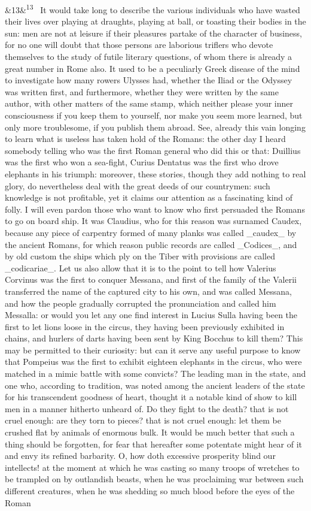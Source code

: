 \documentclass[12pt]{article}
\newcommand{\para}[1][]{\par\noindent\ifx&#1&\else\textsuperscript{\footnotesize #1}~\fi}
\begin{document}
\para[13] It would take long to describe the various individuals who have wasted their lives over playing at draughts, playing at ball, or toasting their bodies in the sun: men are not at leisure if their pleasures partake of the character of business, for no one will doubt that those persons are laborious triflers who devote themselves to the study of futile literary questions, of whom there is already a great number in Rome also. It used to be a peculiarly Greek disease of the mind to investigate how many rowers Ulysses had, whether the Iliad or the Odyssey was written first, and furthermore, whether they were written by the same author, with other matters of the same stamp, which neither please your inner consciousness if you keep them to yourself, nor make you seem more learned, but only more troublesome, if you publish them abroad. See, already this vain longing to learn what is useless has taken hold of the Romans: the other day I heard somebody telling who was the first Roman general who did this or that: Duillius was the first who won a sea-fight, Curius Dentatus was the first who drove elephants in his triumph: moreover, these stories, though they add nothing to real glory, do nevertheless deal with the great deeds of our countrymen: such knowledge is not profitable, yet it claims our attention as a fascinating kind of folly. I will even pardon those who want to know who first persuaded the Romans to go on board ship. It was Claudius, who for this reason was surnamed Caudex, because any piece of carpentry formed of many planks was called \_caudex\_ by the ancient Romans, for which reason public records are called \_Codices\_, and by old custom the ships which ply on the Tiber with provisions are called \_codicariae\_. Let us also allow that it is to the point to tell how Valerius Corvinus was the first to conquer Messana, and first of the family of the Valerii transferred the name of the captured city to his own, and was called Messana, and how the people gradually corrupted the pronunciation and called him Messalla: or would you let any one find interest in Lucius Sulla having been the first to let lions loose in the circus, they having been previously exhibited in chains, and hurlers of darts having been sent by King Bocchus to kill them? This may be permitted to their curiosity: but can it serve any useful purpose to know that Pompeius was the first to exhibit eighteen elephants in the circus, who were matched in a mimic battle with some convicts? The leading man in the state, and one who, according to tradition, was noted among the ancient leaders of the state for his transcendent goodness of heart, thought it a notable kind of show to kill men in a manner hitherto unheard of. Do they fight to the death? that is not cruel enough: are they torn to pieces? that is not cruel enough: let them be crushed flat by animals of enormous bulk. It would be much better that such a thing should be forgotten, for fear that hereafter some potentate might hear of it and envy its refined barbarity. O, how doth excessive prosperity blind our intellects! at the moment at which he was casting so many troops of wretches to be trampled on by outlandish beasts, when he was proclaiming war between such different creatures, when he was shedding so much blood before the eyes of the Roman 
\end{document}
